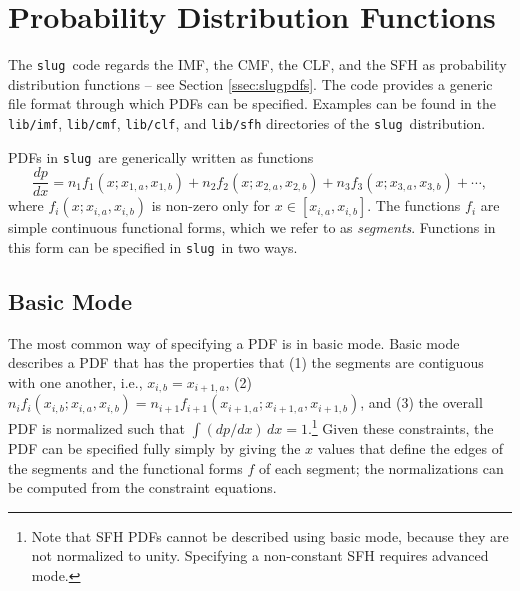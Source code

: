 \documentclass[12pt]{article}
\newcommand{\slug}{\texttt{slug}}
\begin{document}
\section{Probability Distribution Functions}
\label{sec:pdfs}

The \slug\ code regards the IMF, the CMF, the CLF, and the SFH as probability distribution functions -- see Section \ref{ssec:slugpdfs}. The code provides a generic file format through which PDFs can be specified. Examples can be found in the \verb=lib/imf=, \verb=lib/cmf=, \verb=lib/clf=, and \verb=lib/sfh= directories of the \slug\ distribution.

PDFs in \slug\ are generically written as functions
\begin{equation}
\frac{dp}{dx} = n_1 f_1(x; x_{1,a}, x_{1,b}) + n_2 f_2(x; x_{2,a}, x_{2,b}) + n_3 f_3(x; x_{3,a}, x_{3,b}) + \cdots,
\end{equation}
where $f_i(x; x_{i,a}, x_{i,b})$ is non-zero only for $x \in [x_{i,a}, x_{i,b}]$. The functions $f_i$ are simple continuous functional forms, which we refer to as \textit{segments}. Functions in this form can be specified in \slug\ in two ways.


\subsection{Basic Mode}

The most common way of specifying a PDF is in basic mode. Basic mode describes a PDF that has the properties that (1) the segments are contiguous with one another, i.e., $x_{i,b} = x_{i+1,a}$, (2) $n_i f_i(x_{i,b}; x_{i,a}, x_{i,b}) = n_{i+1} f_{i+1}(x_{i+1,a}; x_{i+1,a}, x_{i+1,b})$, and (3) the overall PDF is normalized such that $\int (dp/dx)\, dx = 1$.\footnote{Note that SFH PDFs cannot be described using basic mode, because they are not normalized to unity. Specifying a non-constant SFH requires advanced mode.} Given these constraints, the PDF can be specified fully simply by giving the $x$ values that define the edges of the segments and the functional forms $f$ of each segment; the normalizations can be computed from the constraint equations.
\end{document}
